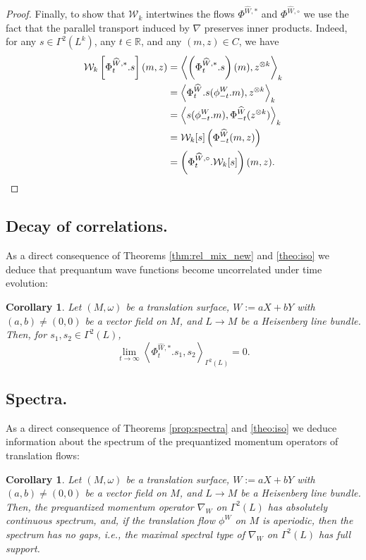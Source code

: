 \documentclass{amsart}
\newtheorem{corollary}[theorem]{Corollary}
\theoremstyle{definition}
\theoremstyle{remark}
\numberwithin{equation}{section}
\newcommand{\wW}{\widehat{W}}
\newcommand{\<}{{\langle}}
\renewcommand{\>}{{\rangle}}
\begin{document}
\begin{proof}
    Finally, to show that $\mathcal{W}_k$ intertwines the flows $\Phi^{\wW,*}$ and $\Phi^{\wW,\circ}$ we use the fact that the parallel transport induced by $\nabla$ preserves inner products. Indeed, for any $s \in \Gamma^2(L^k)$, any $t \in \mathbb{R}$, and any $(m,z) \in C$, we have
    \begin{align*}
    \mathcal{W}_k\left[\Phi^{\wW,*}_t.s \right](m, z) &= \left\langle \left(\Phi^{\wW,*}_t.s\right)(m),z^{\otimes k} \right\rangle_k \\
    &= \left\langle \Phi_t^{\wW}.s(\phi_{-t}^{W}.m ),z^{\otimes k}\right\rangle_k\\
    &= \left\langle s(\phi_{-t}^{W}.m), \Phi_{-t}^{\wW}(z^{\otimes k})\right\rangle_k\\
    &= \mathcal{W}_k[s]\left(\Phi_{-t}^{\wW}(m,z)\right)\\ 
    &= \left(\Phi^{\wW,\circ}_t.\mathcal{W}_k[s]\right)(m,z). \qedhere
    \end{align*}
\end{proof}

\subsection{Decay of correlations.} As a direct consequence of Theorems \ref{thm:rel_mix_new} and \ref{theo:iso} we deduce that prequantum wave functions become uncorrelated under time evolution:

\begin{corollary}
    \label{cor:decay}
    Let $(M,\omega)$ be a translation surface, $W := aX+bY$ with $(a,b) \not = (0,0)$ be a vector field on $M$, and $L \to M$ be a Heisenberg line bundle. Then, for $s_1,s_2 \in \Gamma^2(L)$,
    \[
    \lim_{t \to \infty} \left\langle \Phi_t^{\wW,*}.s_1,s_2 \right\rangle_{\Gamma^2(L)} = 0.
    \]
\end{corollary}

\subsection{Spectra.} As a direct consequence of Theorems \ref{prop:spectra} and \ref{theo:iso} we deduce information about the spectrum of the prequantized momentum operators of translation flows:

\begin{corollary}
    Let $(M,\omega)$ be a translation surface, $W := aX+bY$ with $(a,b) \not = (0,0)$ be a vector field on $M$, and $L \to M$ be a Heisenberg line bundle. Then, the prequantized momentum operator $\nabla_W$ on $\Gamma^2(L)$ has absolutely continuous spectrum, and, if the translation flow $\phi^{W}$ on $M$ is aperiodic, then the spectrum has no gaps, i.e., the maximal spectral type of $\nabla_W$ on $\Gamma^2(L)$ has full support.
\end{corollary}
\end{document}
